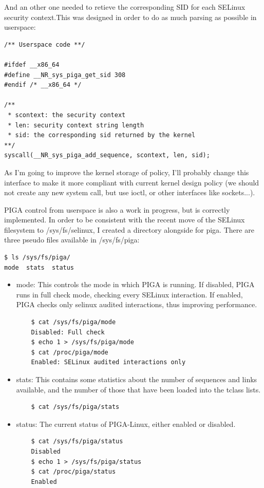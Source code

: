 \documentclass[pdftex,a4paper,titlepage,11pt]{article}
\begin{document}
And an other one needed to retieve the corresponding SID for each SELinux
security context.This was designed in order to do as much parsing as possible in
userspace:

\begin{lstlisting}
/** Userspace code **/

#ifdef __x86_64
#define __NR_sys_piga_get_sid 308
#endif /* __x86_64 */

/**
 * scontext: the security context
 * len: security context string length
 * sid: the corresponding sid returned by the kernel
**/
syscall(__NR_sys_piga_add_sequence, scontext, len, sid);
\end{lstlisting}

As I'm going to improve the kernel storage of policy, I'll probably change this
interface to make it more compliant with current kernel design policy (we should
not create any new system call, but use ioctl, or other interfaces like
sockets...).

PIGA control from userspace is also a work in progress, but is correctly
implemented. In order to be consistent with the recent move of the SELinux
filesystem to /sys/fs/selinux, I created a directory alongside for piga. There
are three pseudo files available in /sys/fs/piga:

\begin{lstlisting}
$ ls /sys/fs/piga/
mode  stats  status
\end{lstlisting}

\begin{itemize}
	\item mode: This controls the mode in which PIGA is running. If disabled,
PIGA runs in full check mode, checking every SELinux interaction. If enabled,
PIGA checks only selinux audited interactions, thus improving performance.
	\begin{lstlisting}
	$ cat /sys/fs/piga/mode
	Disabled: Full check
	$ echo 1 > /sys/fs/piga/mode
	$ cat /proc/piga/mode
	Enabled: SELinux audited interactions only
	\end{lstlisting}
	\item stats: This contains some statistics about the number of sequences and
links available, and the number of those that have been loaded into the tclass
lists.
	\begin{lstlisting}
	$ cat /sys/fs/piga/stats
	\end{lstlisting}
	\item status: The current status of PIGA-Linux, either enabled or disabled.
	\begin{lstlisting}
	$ cat /sys/fs/piga/status
	Disabled
	$ echo 1 > /sys/fs/piga/status
	$ cat /proc/piga/status
	Enabled
	\end{lstlisting}
\end{itemize}
\end{document}
